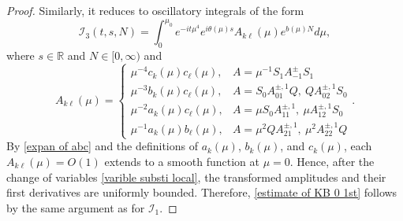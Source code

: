 \documentclass[reqno, 11pt]{amsart}
\newcommand\R{\mathbb{R}}
\newcommand\mcaI{\mathcal{I}}
\numberwithin{equation}{section}
\begin{document}
\begin{proof}
Similarly, it reduces to oscillatory integrals of the form
\begin{equation*}
\mcaI_{3}(t,s,N)=\int_{0}^{\mu_0}e^{-it\mu^4}e^{i\theta(\mu)s}A_{k\ell}(\mu)e^{b(\mu)N}d\mu,
\end{equation*}
where $s\in\R$ and $N\in[0,\infty)$ and
\begin{equation*}
    A_{k\ell}(\mu)=\begin{cases}
    \mu^{-4}c_k(\mu)c_{\ell}(\mu),&A=\mu^{-1}S_{1}A^{\pm}_{-1}S_{1} \\
    \mu^{-3}b_k(\mu)c_{\ell}(\mu),&A=S_0A^{\pm,1}_{01}Q,\ QA^{\pm,1}_{02}S_0 \\
    \mu^{-2}a_k(\mu)c_{\ell}(\mu), &A=\mu S_0A^{\pm,1}_{11},\ \mu A^{\pm,1}_{12}S_0\\
    \mu^{-1}a_k(\mu)b_{\ell}(\mu),&A=\mu^2QA^{\pm,1}_{21},\ \mu^2A^{\pm,1}_{22}Q
    \end{cases}.
\end{equation*}
By \eqref{expan of abc} and the definitions of $a_k(\mu)$, $b_k(\mu)$, and $c_k(\mu)$, each $A_{k\ell}(\mu)=O(1)$ extends to a smooth function at $\mu=0$. Hence, after the change of variables \eqref{varible substi local}, the transformed amplitudes and their first derivatives are uniformly bounded. Therefore, \eqref{estimate of KB 0 1st} follows by the same argument as for $\mcaI_1$.
\end{proof}
\end{document}

